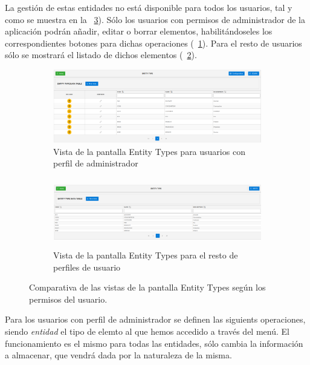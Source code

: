 La gestión de estas entidades no está disponible para todos los usuarios, tal y como se muestra en la \figurename~\ref{fig:parametrizacion}). Sólo los usuarios con permisos de administrador de la aplicación podrán añadir, editar o borrar elementos, habilitándoseles los correspondientes botones para dichas operaciones (\figurename~\ref{fig:parametrizacion-admin}). Para el resto de usuarios sólo se mostrará el listado de dichos elementos (\figurename~\ref{fig:parametrizacion-usuario}).


\begin{figure}[H]
  \centering
  \begin{subfigure}[c]{\textwidth}
    \includegraphics[width=\textwidth]{imaxes/entity-type-admin.png}
    \caption{Vista de la pantalla Entity Types para usuarios con perfil de administrador\newline}
    \label{fig:parametrizacion-admin}
  \end{subfigure}
  \begin{subfigure}[c]{\textwidth}
    \includegraphics[width=\textwidth,height=3cm]{imaxes/entity-type-usuario.png}
    \caption{Vista de la pantalla Entity Types para el resto de perfiles de usuario}
    \label{fig:parametrizacion-usuario}
  \end{subfigure}
  \caption{Comparativa de las vistas de la pantalla Entity Types según los permisos del usuario.}
  \label{fig:parametrizacion}
\end{figure}

Para los usuarios con perfil de administrador se definen las siguients operaciones, siendo \textit{entidad} el tipo de elemto al que hemos accedido a través del menú. El funcionamiento es el mismo para todas las entidades, sólo cambia la información a almacenar, que vendrá dada por la naturaleza de la misma.

